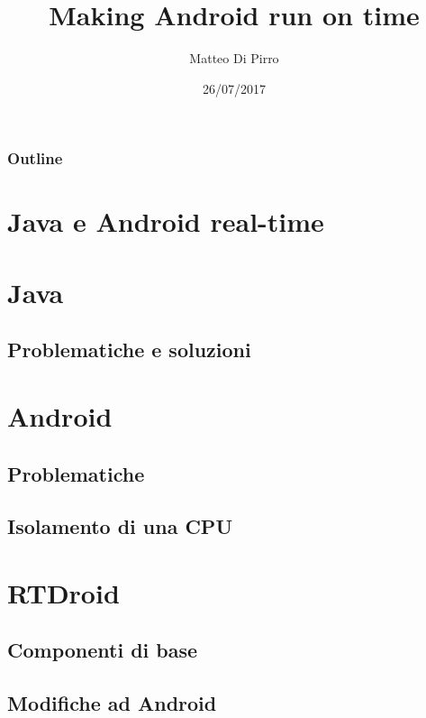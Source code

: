 \documentclass{beamer}
\title{Making Android run on time}
\subtitle{ }
\author{Matteo Di Pirro}
\date{26/07/2017}
\institute{Università degli Studi di Padova}
\begin{document}
\newcommand{\turnOffNumbers}{true} %

\begin{frame}[noframenumbering]
\titlepage
\end{frame}

\let\turnOffNumbers\empty
\begin{frame}
	\frametitle{Outline}
	\tableofcontents
\end{frame}

\section{Java e Android real-time}


\section{Java}
\subsection{Problematiche e soluzioni}



\section{Android}
\subsection{Problematiche}



\subsection{Isolamento di una CPU}




\section{RTDroid}

\subsection{Componenti di base}




\subsection{Modifiche ad Android}






\end{document}
